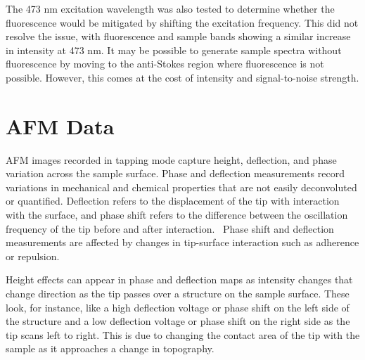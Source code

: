 The 473 nm excitation wavelength was also tested to determine whether the fluorescence would be mitigated by shifting the excitation frequency. This did not resolve the issue, with fluorescence and sample bands showing a similar increase in intensity at 473 nm. It may be possible to generate sample spectra without fluorescence by moving to the anti-Stokes region where fluorescence is not possible. However, this comes at the cost of intensity and signal-to-noise strength.





\section[AFM Data]{AFM Data}
\label{section3.4}


AFM images recorded in tapping mode capture height, deflection, and phase variation across the sample surface. Phase and deflection measurements record variations in mechanical and chemical properties that are not easily deconvoluted or quantified. Deflection refers to the displacement of the tip with interaction with the surface, and phase shift refers to the difference between the oscillation frequency of the tip before and after interaction.~\autocite{iscpi} Phase shift and deflection measurements are affected by changes in tip-surface interaction such as adherence or repulsion. 

Height effects can appear in phase and deflection maps as intensity changes that change direction as the tip passes over a structure on the sample surface. These look, for instance, like a high deflection voltage or phase shift on the left side of the structure and a low deflection voltage or phase shift on the right side as the tip scans left to right. This is due to changing the contact area of the tip with the sample as it approaches a change in topography.~\autocite{iscpi} 

